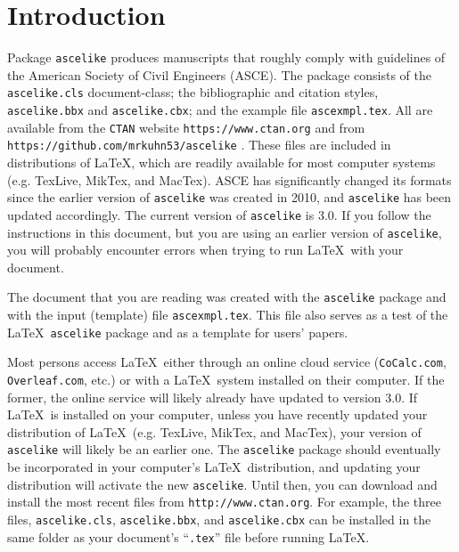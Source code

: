 \documentclass[Proceedings]{ascelike}
\begin{document}
\section{Introduction}\label{sec:Introduction}
%
Package \texttt{ascelike} produces
manuscripts that roughly comply with
guidelines of the American Society of Civil Engineers (ASCE).
The package consists of
the \texttt{ascelike.cls} document-class; the 
bibliographic and citation styles, \texttt{ascelike.bbx}
and \texttt{ascelike.cbx}; and the
example file \texttt{ascexmpl.tex}. 
All are available from the \texttt{CTAN} website
\verb+https://www.ctan.org+
and from \verb+https://github.com/mrkuhn53/ascelike+
\cite{Kuhn:2011a}.
These files are included in
distributions of \LaTeX, which are
readily available for most computer systems
(e.g. \textsf{TexLive}, \textsf{MikTex}, and \textsf{MacTex}).
ASCE has significantly changed its formats
since the earlier version of \texttt{ascelike} was created in 2010,
and \texttt{ascelike} has been updated accordingly.
The current version of \texttt{ascelike} is 3.0.
If you follow the instructions in this document,
but you are using an earlier version of \texttt{ascelike},
you will probably
encounter errors when trying to run \LaTeX\ with your document.
%
\par
The document that you are reading was created with the
\texttt{ascelike} package and with the input (template) file
\texttt{ascexmpl.tex}. 
This file also
serves as a test of
the \LaTeX\ \texttt{ascelike} package and as a template
for users' papers.
%
\par
Most persons access \LaTeX\ either through an online
cloud service (\texttt{CoCalc.com}, \texttt{Overleaf.com}, etc.)
or with a \LaTeX\ system installed on their computer.
If the former, the online service will likely already
have updated to version 3.0.
If \LaTeX\ is installed on your computer,
unless you have recently updated your distribution of 
\LaTeX\ (e.g. \textsf{TexLive}, \textsf{MikTex}, and \textsf{MacTex}),
your version of \texttt{ascelike} will likely be an earlier one.
The \texttt{ascelike} package should eventually be incorporated in
your computer's \LaTeX\ distribution,
and updating your distribution will activate the new
\texttt{ascelike}.
Until then, you can
download and install the most recent files from
\verb+http://www.ctan.org+.
For example, the three files,
\texttt{ascelike.cls}, \texttt{ascelike.bbx}, and \texttt{ascelike.cbx}
can be installed in the same folder as your document's
``\texttt{.tex}'' file before running \LaTeX.
%
\par
\end{document}
